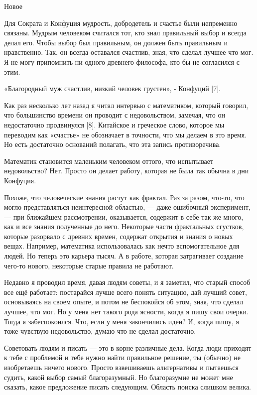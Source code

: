 \documentclass[ebook,12pt,oneside,openany]{memoir}
\begin{document}
Новое

Для Сократа и Конфуция мудрость, добродетель и счастье были непременно
связаны. Мудрым человеком считался тот, кто знал правильный выбор и
всегда делал его. Чтобы выбор был правильным, он должен быть
правильным и нравственно. Так, он всегда оставался счастлив, зная, что
сделал лучшее что мог. Я не могу припомнить ни одного древнего
философа, кто бы не согласился с этим.

«Благородный муж счастлив, низкий человек грустен», - Конфуций [7].

Как раз несколько лет назад я читал интервью с математиком, который
говорил, что большинство времени он проводит с недовольством, замечая,
что он недостаточно продвинулся [8]. Китайское и греческое слово,
которое мы переводим как «счастье» не обозначает в точности, что мы
делаем в это время. Но есть достаточно оснований полагать, что эта
запись противоречива.

Математик становится маленьким человеком оттого, что испытывает
недовольство? Нет. Просто он делает работу, которая не была так обычна
в дни Конфуция.

Похоже, что человеческие знания растут как фрактал. Раз за разом,
что-то, что могло представляться неинтересной областью, — даже
ошибочный эксперимент, — при ближайшем рассмотрении, оказывается,
содержит в себе так же много, как и все знания полученные до него.
Некоторые части фрактальных сгустков, которые разорвало с древних
времен, содержат открытия и знания о новых вещах. Например, математика
использовалась как нечто вспомогательное для людей. Но теперь это
карьера тысяч. А в работе, которая затрагивает создание чего-то
нового, некоторые старые правила не работают.

Недавно я проводил время, давая людям советы, и я заметил, что старый
способ все ещё работает: постарайся лучше всего понять ситуацию, дай
лучший совет, основываясь на своем опыте, и потом не беспокойся об
этом, зная, что сделал лучшее, что мог. Но у меня нет такого рода
ясности, когда я пишу свои очерки. Тогда я забеспокоился. Что, если у
меня закончились идеи? И, когда пишу, я тоже чувствую недовольство,
думаю что не сделал достаточно.

Советовать людям и писать — это в корне различные дела. Когда люди
приходят к тебе с проблемой и тебе нужно найти правильное решение, ты
(обычно) не изобретаешь ничего нового. Просто взвешиваешь альтернативы
и пытаешься судить, какой выбор самый благоразумный. Но благоразумие
не может мне сказать, какое предложение писать следующим. Область
поиска слишком велика.
\end{document}
